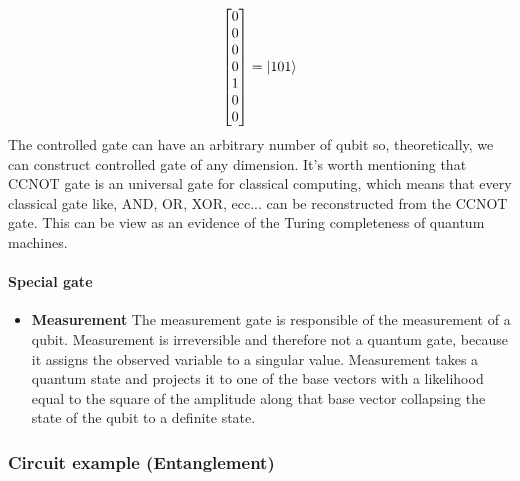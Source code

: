 \documentclass[main.tex]{subfiles}
\theoremstyle{definition}
\begin{document}
\begin{itemize}
$$\begin{bmatrix}
	0\\
	0\\
	0\\
	0\\
	1\\
	0\\
	0\\
	\end{bmatrix}
	=
	\ket{101}
	$$
	The controlled gate can have an arbitrary number of qubit so, theoretically, we can construct controlled gate of 
	any dimension. It's worth mentioning that CCNOT gate is an universal gate for classical computing, which means 
	that every classical gate like, AND, OR, XOR, ecc... can be reconstructed from the CCNOT gate. This can be view 
	as an evidence of the Turing completeness of quantum machines.
	\end{itemize}
	
	\paragraph{Special gate}
	\begin{itemize}
	\item \textbf{Measurement} The measurement gate is responsible of the measurement of a qubit. Measurement is irreversible 
	and therefore not a quantum gate, because it assigns the observed variable to a singular value. Measurement takes a quantum state 
	and projects it to one of the base vectors with a likelihood equal to the square of the amplitude along that base vector collapsing 
	the state of the qubit to a definite state.
	\end{itemize}
	
	\subsubsection{Circuit example (Entanglement)}
	
\end{document}
